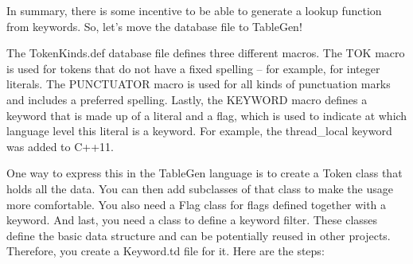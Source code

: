 In summary, there is some incentive to be able to generate a lookup function from keywords. So, let’s move the database file to TableGen!


The TokenKinds.def database file defines three different macros. The TOK macro is used for tokens that do not have a fixed spelling – for example, for integer literals. The PUNCTUATOR macro is used for all kinds of punctuation marks and includes a preferred spelling. Lastly, the KEYWORD macro defines a keyword that is made up of a literal and a flag, which is used to indicate at which language level this literal is a keyword. For example, the thread\_local keyword was added to C++11.

One way to express this in the TableGen language is to create a Token class that holds all the data. You can then add subclasses of that class to make the usage more comfortable. You also need a Flag class for flags defined together with a keyword. And last, you need a class to define a keyword filter. These classes define the basic data structure and can be potentially reused in other projects. Therefore, you create a Keyword.td file for it. Here are the steps:

